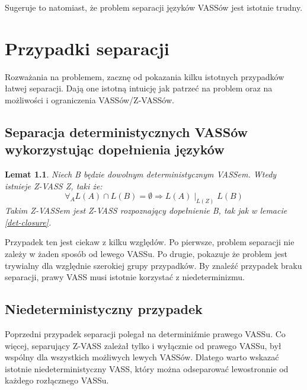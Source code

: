 \documentclass[magisterska]{pracamgr}
\newtheorem{lemma}[theorem]{Lemat}
\begin{document}
    Sugeruje to natomiast, że problem separacji języków VASSów jest istotnie trudny.






    \chapter{Przypadki separacji}
    Rozważania na problemem, zacznę od pokazania kilku istotnych przypadków łatwej separacji.
    Dają one istotną intuicję jak patrzeć na problem oraz na możliwości i ograniczenia VASSów/Z-VASSów.


    \section{Separacja deterministycznych VASSów wykorzystując dopełnienia języków}
    \begin{lemma}
        \label{deterministic_separation}
        Niech B będzie dowolnym deterministycznym VASSem.
        Wtedy istnieje Z-VASS Z, taki że:
        \[\forall_A L(A) \cap L(B) = \emptyset \Rightarrow L(A) \mid_{L(Z)} L(B)\]
        Takim Z-VASSem jest Z-VASS rozpoznający dopełnienie B, tak jak w lemacie \ref{det-closure}.

    \end{lemma}
    Przypadek ten jest ciekaw z kilku względów.
    Po pierwsze, problem separacji nie zależy w żaden sposób od lewego VASSu.
    Po drugie, pokazuje że problem jest trywialny dla względnie szerokiej grupy przypadków.
    By znaleźć przypadek braku separacji, prawy VASS musi istotnie korzystać z niedeterminizmu.


    \section{Niedeterministyczny przypadek}
    Poprzedni przypadek separacji polegał na determiniźmie prawego VASSu.
    Co więcej, separujący Z-VASS zależał tylko i wyłącznie od prawego VASSu, był wspólny dla wszystkich możliwych lewych VASSów.
    Dlatego warto wskazać istotnie niedeterministyczny VASS, który można odseparować lewostronnie od każdego rozłącznego VASSu.
\end{document}
